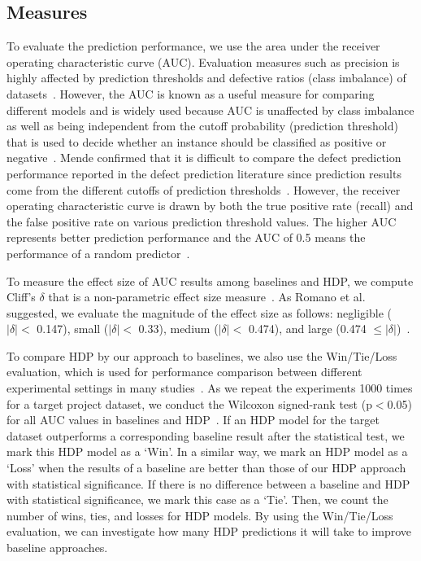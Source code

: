 \subsection{Measures}
\label{sec:measure}
To evaluate the prediction performance, we use the area under the receiver
operating characteristic curve (AUC). Evaluation measures such as precision is highly affected by prediction thresholds and defective ratios (class imbalance) of datasets~\cite{Tantithamthavorn16}.
However, the AUC is known as a useful measure for comparing
different models and is widely used because AUC is unaffected by class imbalance
as well as being independent from the cutoff probability (prediction
threshold) that is used to decide whether an instance should be classified as
positive or negative~\cite{Giger12,Lessmann08,Rahman12,Song11,Tantithamthavorn16}.
Mende confirmed that it is difficult to compare the defect prediction
performance reported in the defect prediction literature since prediction
results come from the different cutoffs of prediction thresholds~\cite{Mende10}.
However, the receiver operating characteristic curve is drawn by both the true
positive rate (recall) and the false positive rate on  various prediction
threshold values.
The higher AUC represents better prediction performance and the AUC of 0.5 means
the performance of a random predictor~\cite{Rahman12}.

To measure the effect size of AUC results among baselines and HDP, we compute Cliff's $\delta$ that is a non-parametric effect size measure~\cite{romano06}. As Romano et al. suggested, we evaluate the magnitude of the effect size as follows: negligible ($|\delta|<$ 0.147), small ($|\delta|<$ 0.33), medium ($|\delta|<$ 0.474), and large (0.474 $\leq|\delta|$)~\cite{romano06}.

To compare HDP by our approach to baselines, we also use the
Win/Tie/Loss evaluation, which is used for performance comparison between
different experimental settings in many studies~\cite{Kocaguneli13,Li12,
Valentini03}. As we repeat the experiments 1000 times for a target project
dataset, we
conduct the Wilcoxon signed-rank test (p$<$0.05) for all AUC values in
baselines and HDP~\cite{Wilcoxon45}.
If an HDP model for the target dataset outperforms a corresponding
baseline result after the statistical test, we mark this HDP model as a `Win'.
In a similar way, we mark an HDP model as a `Loss' when the results of
a baseline are better than those of our HDP approach with statistical
significance.
If there is no difference between a baseline and HDP with statistical
significance, we mark this case as a `Tie'. Then, we count the number of
wins, ties, and losses for HDP models. By using the Win/Tie/Loss
evaluation, we can investigate how many HDP predictions it will take to improve
baseline approaches.
